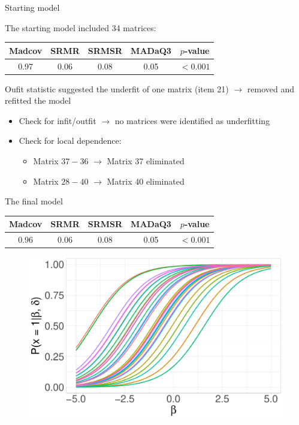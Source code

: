 \documentclass{beamer}
\begin{document}
\begin{frame}{Starting model}

	
	The starting model included 34 matrices: 
	
	\begin{table}
		\centering
		\begin{tabular}[t]{c cc cc}
			\hline
			Madcov & SRMR & SRMSR & MADaQ3 & $p$-value\\
			\hline
			0.97 & 0.06 & 0.08 & 0.05 & $<0.001$\\
			\hline
		\end{tabular}
	\end{table}
	
	\vspace{10mm}
Oufit statistic suggested the underfit of one matrix (item 21) $\rightarrow$ removed and refitted the model 
	
	
	\begin{itemize}
		\item Check for infit/outfit $\rightarrow$ no matrices were identified as underfitting
		\item Check for local dependence: 
		
		\begin{itemize}
			\item Matrix $37 - 36$ $\rightarrow$ Matrix 37 eliminated
			\item Matrix $28 -  40$ $\rightarrow$ Matrix 40 eliminated
			
		\end{itemize}
	\end{itemize}
\end{frame}


\begin{frame}{The final model}

\begin{table}
	
	\centering
	\begin{tabular}[t]{ccccc}
		\hline
			Madcov & SRMR & SRMSR & MADaQ3 & $p$-value\\
		\hline
		0.96 & 0.06 & 0.08 & 0.05 & $<0.001$\\
		\hline
	\end{tabular}
\end{table}

\pause

\vspace{5mm}
\begin{figure}
\centering

\includegraphics[width=.7\linewidth]{img/icc.pdf}
\end{figure}
	
\end{frame}
\end{document}
